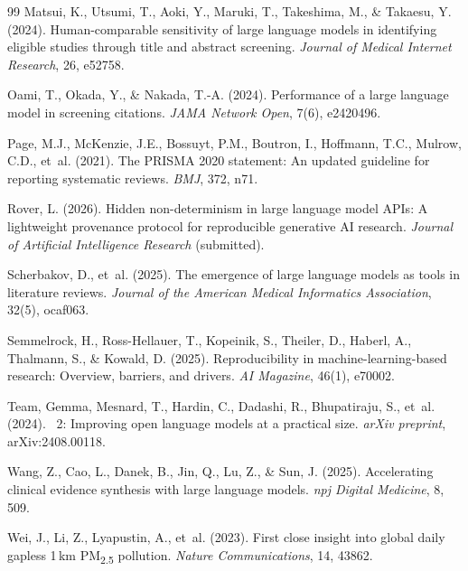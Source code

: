 \documentclass[12pt, a4paper]{article}
\begin{document}
\begin{thebibliography}{99}
Matsui, K., Utsumi, T., Aoki, Y., Maruki, T., Takeshima, M., \& Takaesu, Y. (2024).
\newblock Human-comparable sensitivity of large language models in identifying eligible studies through title and abstract screening.
\newblock \emph{Journal of Medical Internet Research}, 26, e52758.

Oami, T., Okada, Y., \& Nakada, T.-A. (2024).
\newblock Performance of a large language model in screening citations.
\newblock \emph{JAMA Network Open}, 7(6), e2420496.

Page, M.J., McKenzie, J.E., Bossuyt, P.M., Boutron, I., Hoffmann, T.C., Mulrow, C.D., et~al. (2021).
\newblock The {PRISMA} 2020 statement: An updated guideline for reporting systematic reviews.
\newblock \emph{BMJ}, 372, n71.

Rover, L. (2026).
\newblock Hidden non-determinism in large language model APIs: A lightweight provenance protocol for reproducible generative AI research.
\newblock \emph{Journal of Artificial Intelligence Research} (submitted).

Scherbakov, D., et~al. (2025).
\newblock The emergence of large language models as tools in literature reviews.
\newblock \emph{Journal of the American Medical Informatics Association}, 32(5), ocaf063.

Semmelrock, H., Ross-Hellauer, T., Kopeinik, S., Theiler, D., Haberl, A., Thalmann, S., \& Kowald, D. (2025).
\newblock Reproducibility in machine-learning-based research: Overview, barriers, and drivers.
\newblock \emph{AI Magazine}, 46(1), e70002.

Team, Gemma, Mesnard, T., Hardin, C., Dadashi, R., Bhupatiraju, S., et~al. (2024).
~2: Improving open language models at a practical size.
\newblock \emph{arXiv preprint}, arXiv:2408.00118.

Wang, Z., Cao, L., Danek, B., Jin, Q., Lu, Z., \& Sun, J. (2025).
\newblock Accelerating clinical evidence synthesis with large language models.
\newblock \emph{npj Digital Medicine}, 8, 509.

Wei, J., Li, Z., Lyapustin, A., et~al. (2023).
\newblock First close insight into global daily gapless 1\,km PM\textsubscript{2.5} pollution.
\newblock \emph{Nature Communications}, 14, 43862.


\end{thebibliography}
\end{document}

